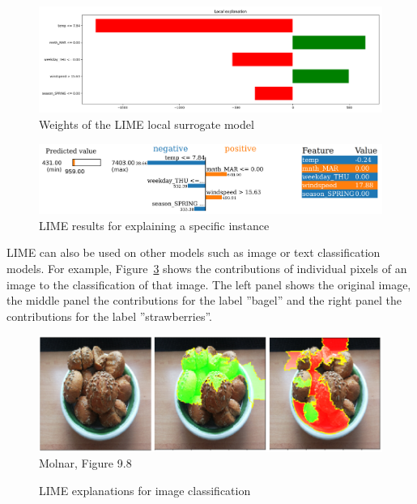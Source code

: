 \begin{figure}
\centering

\includegraphics[width=\textwidth]{lime_dt.png}
\caption{Weights of the LIME local surrogate model}
\label{fig:limecontribs}
\end{figure}

\begin{figure}
\centering

\includegraphics[width=\textwidth]{lime_explanation.png}
\caption{LIME results for explaining a specific instance}
\label{fig:limeexplanation}
\end{figure}

LIME can also be used on other models such as image or text classification models. For example, Figure~\ref{fig:molnar98} shows the contributions of individual pixels of an image to the classification of that image. The left panel shows the original image, the middle panel the contributions for the label ''bagel'' and the right panel the contributions for the label ''strawberries''. 

\begin{figure}
\centering
\includegraphics[width=\textwidth]{molnar-9-8.png} \\

\scriptsize Molnar, Figure 9.8
\caption{LIME explanations for image classification}
\label{fig:molnar98}
\end{figure}

